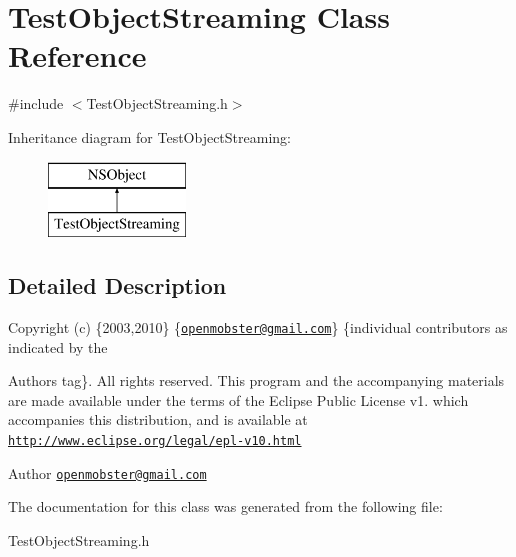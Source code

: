 \hypertarget{interface_test_object_streaming}{
\section{\-Test\-Object\-Streaming \-Class \-Reference}
\label{interface_test_object_streaming}
}


{\ttfamily \#include $<$\-Test\-Object\-Streaming.\-h$>$}

\-Inheritance diagram for \-Test\-Object\-Streaming\-:\begin{figure}[H]
\begin{center}
\leavevmode
\includegraphics[height=2.000000cm]{interface_test_object_streaming}
\end{center}
\end{figure}


\subsection{\-Detailed \-Description}
\-Copyright (c) \{2003,2010\} \{\href{mailto:openmobster@gmail.com}{\tt openmobster@gmail.\-com}\} \{individual contributors as indicated by the \begin{DoxyAuthor}{\-Authors}
tag\}. \-All rights reserved. \-This program and the accompanying materials are made available under the terms of the \-Eclipse \-Public \-License v1. which accompanies this distribution, and is available at \href{http://www.eclipse.org/legal/epl-v10.html}{\tt http\-://www.\-eclipse.\-org/legal/epl-\/v10.\-html}
\end{DoxyAuthor}
\begin{DoxyAuthor}{\-Author}
\href{mailto:openmobster@gmail.com}{\tt openmobster@gmail.\-com} 
\end{DoxyAuthor}


\-The documentation for this class was generated from the following file\-:\begin{DoxyCompactItemize}
\item 
\-Test\-Object\-Streaming.\-h\end{DoxyCompactItemize}
